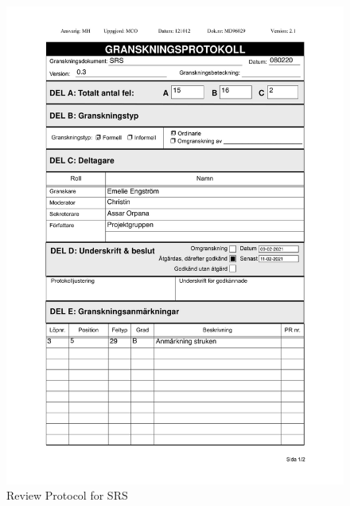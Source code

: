 \documentclass{article}
\begin{document}
 
\begin{figure}
     \centering
     \includegraphics[width=13cm]{images/SRS - Granskningsprotokoll-1}
     \renewcommand\figurename{Figure}
      \caption{Review Protocol for SRS}
     \label{fig:my_label}
 \end{figure}
 
\end{document}
